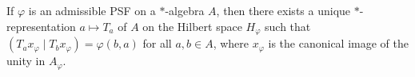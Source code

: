 If $\varphi$ is an admissible PSF on a $*$-algebra $A$, then there exists a unique $*$-representation $a \mapsto T_a$ of $A$ on the Hilbert space $H_\varphi$ such that $(T_a x_\varphi \mid T_b x_\varphi) = \varphi(b, a)$ for all $a, b \in A$, where $x_\varphi$ is the canonical image of the unity in $A_\varphi$.
